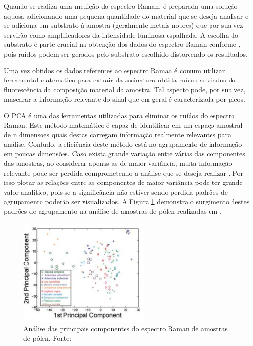 \documentclass[conference,peerreview]{IEEEtran}
\begin{document}
Quando se realiza uma medição do espectro Raman, é preparada uma solução aquosa adicionando uma pequena quantidade do material que se deseja analisar e se adiciona um substrato à amostra (geralmente metais nobres) que por sua vez servirão como amplificadores da intensidade luminosa espalhada. A escolha do substrato é parte crucial na obtenção dos dados do espectro Raman conforme \cite{Seifert2016}, pois ruídos podem ser gerados pelo substrato escolhido distorcendo os resultados.

Uma vez obtidos os dados referentes ao espectro Raman é comum utilizar ferramental matemático para extrair da assinatura obtida ruídos advindos da fluorescência da composição material da amostra. Tal aspecto pode, por sua vez, mascarar a informação relevante do sinal que em geral é caracterizada por picos.

O PCA é uma das ferramentas utilizadas para eliminar os ruídos do espectro Raman. Este método matemático é capaz de identificar em um espaço amostral de n dimensões quais destas carregam informação realmente relevantes para análise. Contudo, a eficiência deste método está no agrupamento de informação em poucas dimensões. Caso exista grande variação entre várias das componentes das amostras, ao considerar apenas as de maior variância, muita informação relevante pode ser perdida comprometendo a análise que se deseja realizar \cite{Brereton2017}. Por isso plotar as relações entre as componentes de maior variância pode ter grande valor analítico, pois se a significância não estiver sendo perdida padrões de agrupamento poderão ser visualizados. A Figura \ref{pca_exemplo} demonstra o surgimento destes padrões de agrupamento na análise de amostras de pólen realizadas em \cite{Seifert2016}.

\begin{figure}[ht]
\centering
\includegraphics[width=6.5cm]{pca_exemplo}
\caption{Análise das principais componentes do espectro Raman de amostras de pólen. Fonte: \cite{Seifert2016}}
\label{pca_exemplo}
\end{figure}
\end{document}
